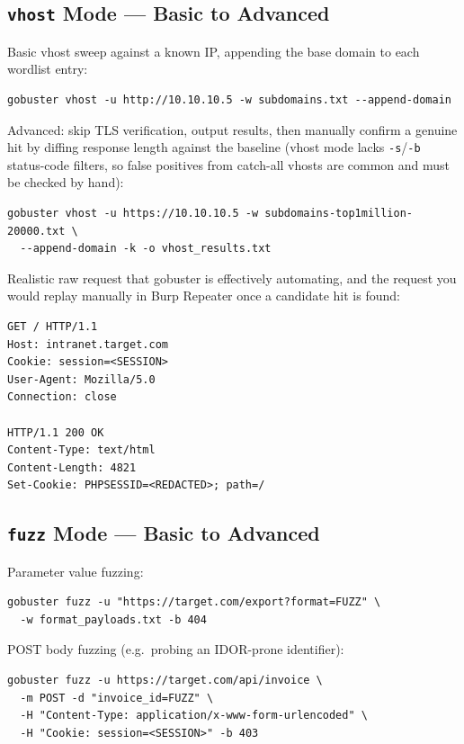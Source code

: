 \documentclass[11pt]{article}
\begin{document}
\subsection{\texttt{vhost} Mode --- Basic to Advanced}

Basic vhost sweep against a known IP, appending the base domain to each wordlist entry:
\begin{lstlisting}[style=http]
gobuster vhost -u http://10.10.10.5 -w subdomains.txt --append-domain
\end{lstlisting}

Advanced: skip TLS verification, output results, then manually confirm a genuine hit by diffing response length against the baseline (vhost mode lacks \texttt{-s}/\texttt{-b} status-code filters, so false positives from catch-all vhosts are common and must be checked by hand):
\begin{lstlisting}[style=http]
gobuster vhost -u https://10.10.10.5 -w subdomains-top1million-20000.txt \
  --append-domain -k -o vhost_results.txt
\end{lstlisting}

Realistic raw request that gobuster is effectively automating, and the request you would replay manually in Burp Repeater once a candidate hit is found:
\begin{lstlisting}[style=http]
GET / HTTP/1.1
Host: intranet.target.com
Cookie: session=<SESSION>
User-Agent: Mozilla/5.0
Connection: close

HTTP/1.1 200 OK
Content-Type: text/html
Content-Length: 4821
Set-Cookie: PHPSESSID=<REDACTED>; path=/
\end{lstlisting}

\subsection{\texttt{fuzz} Mode --- Basic to Advanced}

Parameter value fuzzing:
\begin{lstlisting}[style=http]
gobuster fuzz -u "https://target.com/export?format=FUZZ" \
  -w format_payloads.txt -b 404
\end{lstlisting}

POST body fuzzing (e.g.\ probing an IDOR-prone identifier):
\begin{lstlisting}[style=http]
gobuster fuzz -u https://target.com/api/invoice \
  -m POST -d "invoice_id=FUZZ" \
  -H "Content-Type: application/x-www-form-urlencoded" \
  -H "Cookie: session=<SESSION>" -b 403
\end{lstlisting}
\end{document}
